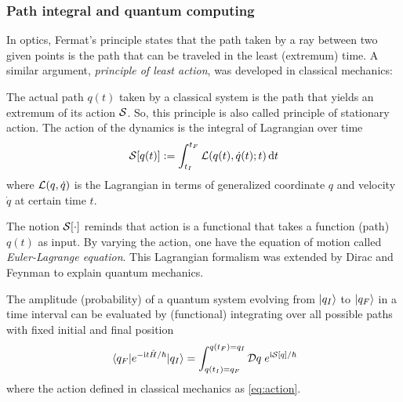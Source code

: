 \subsubsection{Path integral and quantum computing}
\cite{xuLagrangianFormalismQuantum2021}
In optics, Fermat's principle states that the path taken by a ray between two given points is the path that can be traveled in the least (extremum) time. 
A similar argument, \emph{principle of least action}, was developed in classical mechanics:
\begin{axiom}\label{thm:least_action}
    The actual path $q(t)$ taken by a classical system is the path that 
	yields an extremum of its action \(\mathcal{S}\).
	So, this principle is also called principle of stationary action.
	The action of the dynamics is the integral of Lagrangian over time
	\begin{equation}
		\mathcal{S}[q(t)]:=\int_{t_I}^{t_F}\mathcal{L}(q(t),\dot{q}(t);t)\dd{t}
		\label{eq:action}
	\end{equation}
	where $\mathcal{L}(q,\dot{q})$ is the Lagrangian in terms of generalized coordinate $q$ and velocity $\dot{q}$ at certain time $t$. 
\end{axiom}
The notion $\mathcal{S}[\cdot]$ reminds that action is a functional that takes a function (path) $q(t)$ as input.
By varying the action, one have the equation of motion 
called \emph{Euler-Lagrange equation}.
This Lagrangian formalism was extended by Dirac \cite{diracAnalogyClassicalQuantum1945} and Feynman \cite{feynmanQuantumMechanicsPath2010} to explain quantum mechanics. 
\begin{axiom}\label{thm:path_integral}
    The amplitude (probability) of a quantum system evolving from $\ket{q_I}$ to $\ket{q_F}$ in a time interval can be evaluated by (functional) integrating over all possible paths with fixed initial and final position 
    \begin{equation}
		\mel{q_F}{e^{-\textup{i}t\hat{H}/\hbar}}{q_I} =
        \int_{q(t_I)= q_F}^{q(t_F)=q_I} \mathcal{D} q \; e^{\textup{i} \mathcal{S}[q]/\hbar}
    \end{equation}
	where the action defined in classical mechanics as \cref{eq:action}.
\end{axiom}
